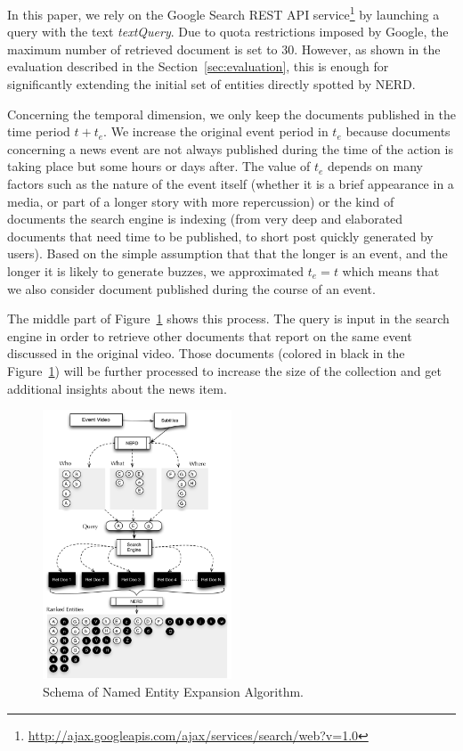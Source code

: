 \documentclass{llncs}
\begin{document}
In this paper, we rely on the Google Search REST API service\footnote{\fontsize{8pt}{1em}\selectfont  \url{http://ajax.googleapis.com/ajax/services/search/web?v=1.0}} by launching a query with the text \textit{textQuery}. Due to quota restrictions imposed by Google, the maximum number of retrieved document is set to 30. However, as shown in the evaluation described in the Section~\ref{sec:evaluation}, this is enough for significantly extending the initial set of entities directly spotted by NERD.

Concerning the temporal dimension, we only keep the documents published in the time period $t+t_{e}$. We increase the original event period in $t_{e}$ because documents concerning a news event are not always published during the time of the action is taking place but some hours or days after. The value of $t_{e}$ depends on many factors such as the nature of the event itself (whether it is a brief appearance in a media, or part of a longer story with more repercussion) or the kind of documents the search engine is indexing (from very deep and elaborated documents that need time to be published, to short post quickly generated by users). Based on the simple assumption that that the longer is an event, and the longer it is likely to generate buzzes, we approximated  $t_{e} = t$ which means that we also consider document published during the course of an event.

The middle part of Figure~\ref{fig:namedEntityExpansion} shows this process. The query is input in the search engine in order to retrieve other documents that report on the same event discussed in the original video. Those documents (colored in black in the Figure~\ref{fig:namedEntityExpansion}) will be further processed to increase the size of the collection and get additional insights about the news item.

\begin{figure}[h!]
\centering
\includegraphics[width=0.5\textwidth]{figure/ExpansionDiagram}
\caption{Schema of Named Entity Expansion Algorithm.}
\label{fig:namedEntityExpansion}%
\end{figure}
\end{document}
